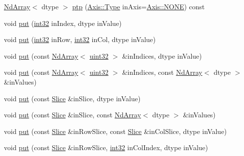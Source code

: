 \begin{DoxyCompactItemize}
\item 
\mbox{\hyperlink{class_num_cpp_1_1_nd_array}{Nd\+Array}}$<$ dtype $>$ \mbox{\hyperlink{class_num_cpp_1_1_nd_array_acda9fe6d992152beb3748140bfc29da8}{ptp}} (\mbox{\hyperlink{struct_num_cpp_1_1_axis_ac10eb76f8631762d9ed70c40c42ca6cb}{Axis\+::\+Type}} in\+Axis=\mbox{\hyperlink{struct_num_cpp_1_1_axis_ac10eb76f8631762d9ed70c40c42ca6cba747ae657022cca1d87702b56d0c038e9}{Axis\+::\+N\+O\+NE}}) const
\item 
void \mbox{\hyperlink{class_num_cpp_1_1_nd_array_a49b276a6a6750339e81e3d7e46579d4e}{put}} (\mbox{\hyperlink{namespace_num_cpp_acf3eb1592f8b248ff0a236634864633c}{int32}} in\+Index, dtype in\+Value)
\item 
void \mbox{\hyperlink{class_num_cpp_1_1_nd_array_abdf357a70b9eed42b250c8ce072cf170}{put}} (\mbox{\hyperlink{namespace_num_cpp_acf3eb1592f8b248ff0a236634864633c}{int32}} in\+Row, \mbox{\hyperlink{namespace_num_cpp_acf3eb1592f8b248ff0a236634864633c}{int32}} in\+Col, dtype in\+Value)
\item 
void \mbox{\hyperlink{class_num_cpp_1_1_nd_array_af0dc59bae81a8d736cf0e8c9c92f71e9}{put}} (const \mbox{\hyperlink{class_num_cpp_1_1_nd_array}{Nd\+Array}}$<$ \mbox{\hyperlink{namespace_num_cpp_a36f388e948380413c63011cab9b7fbd5}{uint32}} $>$ \&in\+Indices, dtype in\+Value)
\item 
void \mbox{\hyperlink{class_num_cpp_1_1_nd_array_ae62e28e74f0665ab01f3ad2984bf27e7}{put}} (const \mbox{\hyperlink{class_num_cpp_1_1_nd_array}{Nd\+Array}}$<$ \mbox{\hyperlink{namespace_num_cpp_a36f388e948380413c63011cab9b7fbd5}{uint32}} $>$ \&in\+Indices, const \mbox{\hyperlink{class_num_cpp_1_1_nd_array}{Nd\+Array}}$<$ dtype $>$ \&in\+Values)
\item 
void \mbox{\hyperlink{class_num_cpp_1_1_nd_array_aa0b9bc04c12b9ab2fa1e031aa1f2f42d}{put}} (const \mbox{\hyperlink{class_num_cpp_1_1_slice}{Slice}} \&in\+Slice, dtype in\+Value)
\item 
void \mbox{\hyperlink{class_num_cpp_1_1_nd_array_a884168d3130615e8722df602cd96beb8}{put}} (const \mbox{\hyperlink{class_num_cpp_1_1_slice}{Slice}} \&in\+Slice, const \mbox{\hyperlink{class_num_cpp_1_1_nd_array}{Nd\+Array}}$<$ dtype $>$ \&in\+Values)
\item 
void \mbox{\hyperlink{class_num_cpp_1_1_nd_array_a70d4c18e43f58365431977562046b631}{put}} (const \mbox{\hyperlink{class_num_cpp_1_1_slice}{Slice}} \&in\+Row\+Slice, const \mbox{\hyperlink{class_num_cpp_1_1_slice}{Slice}} \&in\+Col\+Slice, dtype in\+Value)
\item 
void \mbox{\hyperlink{class_num_cpp_1_1_nd_array_a7b4b5d53227f3a85d5bef1782162b07d}{put}} (const \mbox{\hyperlink{class_num_cpp_1_1_slice}{Slice}} \&in\+Row\+Slice, \mbox{\hyperlink{namespace_num_cpp_acf3eb1592f8b248ff0a236634864633c}{int32}} in\+Col\+Index, dtype in\+Value)

\end{DoxyCompactItemize}
